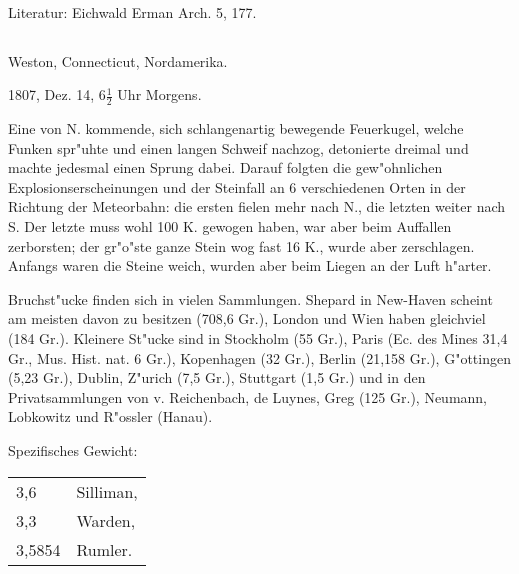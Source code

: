 \documentclass[a4paper, 11pt, oneside]{article}
\begin{document}
\paragraph{}
Literatur: Eichwald Erman Arch. 5, 177.
\subsection{}
\LARGE
\paragraph{}
Weston, Connecticut, Nordamerika.

1807, Dez. 14, $\mathfrak{6\frac{1}{2}}$ Uhr Morgens.

Eine von N. kommende, sich schlangenartig bewegende Feuerkugel, welche Funken spr"uhte und einen langen Schweif nachzog, detonierte dreimal und machte jedesmal einen Sprung dabei. Darauf folgten die gew"ohnlichen Explosionserscheinungen und der Steinfall an 6 verschiedenen Orten in der Richtung der Meteorbahn: die ersten fielen mehr nach N., die letzten weiter nach S. Der letzte muss wohl 100 K. gewogen haben, war aber beim Auffallen zerborsten; der gr"o"ste ganze Stein wog fast 16 K., wurde aber zerschlagen. Anfangs waren die Steine weich, wurden aber beim Liegen an der Luft h"arter.

Bruchst"ucke finden sich in vielen Sammlungen. Shepard in New-Haven scheint am meisten davon zu besitzen (708,6 Gr.), London und Wien haben gleichviel (184 Gr.). Kleinere St"ucke sind in Stockholm (55 Gr.), Paris (Ec. des Mines 31,4 Gr., Mus. Hist. nat. 6 Gr.), Kopenhagen (32 Gr.), Berlin (21,158 Gr.), G"ottingen (5,23 Gr.), Dublin, Z"urich (7,5 Gr.), Stuttgart (1,5 Gr.) und in den Privatsammlungen von v. Reichenbach, de Luynes, Greg (125 Gr.), Neumann, Lobkowitz und R"ossler (Hanau).

Spezifisches Gewicht:
\begin{table}[!ht]
    \centering\swabfamily\Large
    \begin{tabular}{l l}
        3,6 & Silliman,\\
        3,3 & Warden,\\
        3,5854 & Rumler.
    \end{tabular}
\end{table}
\end{document}
